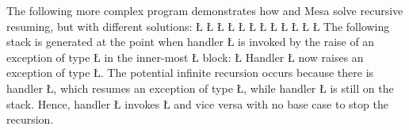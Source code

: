 \documentclass[openright,twoside]{report}
\begin{document}
The following more complex program demonstrates how \uC and Mesa solve recursive resuming, but with different solutions:
\LGinlinefalse\LGbegin\lgrinde
\L{}
\L{}
\L{\LB{}}
\L{}
\L{\LB{}}
\L{\LB{}}
\L{\LB{}}
\L{\LB{}}
\L{\LB{}}
\CE{}\L{\LB{}}
\CE{}\L{\LB{}}
\CE{}\L{\LB{\}}}
\endlgrinde\LGend
The following stack is generated at the point when handler \LGinlinetrue\LGbegin\lgrinde\L{}\endlgrinde\LGend{} is invoked by the raise of an exception of type \LGinlinetrue\LGbegin\lgrinde\L{}\endlgrinde\LGend{} in the inner-most \LGinlinetrue\LGbegin\lgrinde\L{}\endlgrinde\LGend{} block:
\LGinlinefalse\LGbegin\lgrinde
\L{}
\endlgrinde\LGend
Handler \LGinlinetrue\LGbegin\lgrinde\L{}\endlgrinde\LGend{} now raises an exception of type \LGinlinetrue\LGbegin\lgrinde\L{}\endlgrinde\LGend{}.
The potential infinite recursion occurs because there is handler \LGinlinetrue\LGbegin\lgrinde\L{}\endlgrinde\LGend{}, which resumes an exception of type \LGinlinetrue\LGbegin\lgrinde\L{}\endlgrinde\LGend{}, while handler \LGinlinetrue\LGbegin\lgrinde\L{}\endlgrinde\LGend{} is still on the stack.
Hence, handler \LGinlinetrue\LGbegin\lgrinde\L{}\endlgrinde\LGend{} invokes \LGinlinetrue\LGbegin\lgrinde\L{}\endlgrinde\LGend{} and vice versa with no base case to stop the recursion.
\end{document}

